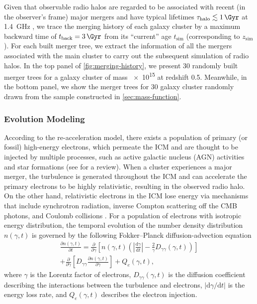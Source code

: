 \documentclass[twocolumn]{aastex62}
\newcommand{\R}[1]{\mathrm{#1}}
\newcommand{\D}[1]{\R{d} #1}
\newcommand{\diff}[2]{\frac{\D{#1}}{\D{#2}}}
\newcommand{\pdiff}[2]{\frac{\partial #1}{\partial #2}}
\newcommand{\editone}[1]{{\leavevmode\color{cyan}#1}}
\begin{document}
Given that observable radio halos are regarded to be associated
with recent (in the observer's frame) major mergers
and have typical lifetimes $\tau_{\R{halo}} \lesssim \SI{1}{\Gyr}$
at \SI{1.4}{\GHz} \citep[e.g.,][]{brunetti2009,cassano2016},
we trace the merging history of each galaxy cluster by a maximum
backward time of $t_{\R{back}} = \SI{3}{\Gyr}$ from its \enquote{current}
age $t_{\R{sim}}$ (corresponding to $z_{\R{sim}}$).
For each built merger tree, we extract the information of all
the mergers associated with the main cluster to carry out the
subsequent simulation of radio halos.
\editone{%
In the top panel of \autoref{fig:merging-history}, we present 30 randomly
built merger trees for a galaxy cluster of mass \SI{e15}{\solarmass} at
redshift 0.5.
Meanwhile, in the bottom panel, we show the merger trees for 30 galaxy
cluster randomly drawn from the sample constructed in
\autoref{sec:mass-function}.
}


\subsubsection{\editone{Evolution Modeling}}
\label{sec:halo-evo}

According to the re-acceleration model, there exists a population of
primary (or fossil) high-energy electrons, which permeate the ICM and
are thought to be injected by multiple processes, such as active
galactic nucleus (AGN) activities and star formations
(see \citealt{blasi2007rev} for a review).
When a cluster experiences a major merger, the turbulence is generated
throughout the ICM and can accelerate the primary electrons to be highly
relativistic, resulting in the observed radio halo.
On the other hand, relativistic electrons in the ICM lose energy via
mechanisms that include synchrotron radiation, inverse Compton scattering
off the CMB photons, and Coulomb collisions \citep{sarazin1999}.
For a population of electrons with isotropic energy distribution, the
temporal evolution of the number density distribution $n(\gamma, t)$
is governed by the following Fokker--Planck diffusion-advection equation
\citep{eilek1991,schlickeiser2002}
\begin{multline}
  \label{eq:fokkerplanck}
  \pdiff{n(\gamma,t)}{t} = \pdiff{}{\gamma} \left[ n(\gamma,t) \left(
      \left| \diff{\gamma}{t} \right| -
      \frac{2}{\gamma} D_{\gamma\gamma}(\gamma, t) \right) \right] \\
    + \pdiff{}{\gamma} \left[ D_{\gamma\gamma} \pdiff{n(\gamma,t)}{\gamma}
    \right] + Q_e(\gamma,t),
\end{multline}
where $\gamma$ is the Lorentz factor of electrons,
$D_{\gamma\gamma}(\gamma, t)$ is the diffusion coefficient describing
the interactions between the turbulence and electrons,
$|\R{d}\gamma / \R{d}t|$ is the energy loss rate,
and $Q_e(\gamma, t)$ describes the electron injection.
\end{document}
